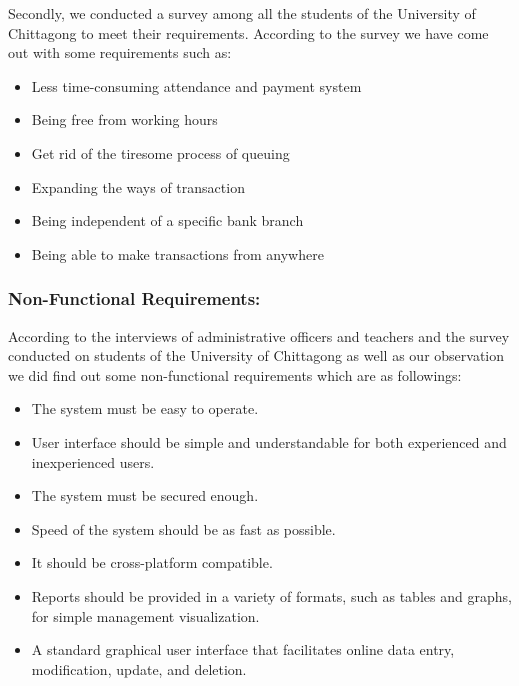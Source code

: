 Secondly, we conducted a survey among all the students of the University of Chittagong to meet their requirements. According to the survey we have come out with some requirements such as:
\begin{itemize}
	\item Less time-consuming attendance and payment system
	\item Being free from working hours 
	\item Get rid of the tiresome process of queuing
	\item Expanding the ways of transaction
	\item Being independent of a specific bank branch
	\item Being able to make transactions from anywhere
\end{itemize}

\subsubsection{Non-Functional Requirements:}\label{subsub:nonfunreq}
According to the interviews of administrative officers and teachers and the survey conducted on students of the University of Chittagong as well as our observation we did find out some non-functional requirements which are as followings:
\begin{itemize}
	\item The system must be easy to operate.
	\item User interface should be simple and understandable for both experienced and inexperienced users.
	\item The system must be secured enough.
	\item Speed of the system should be as fast as possible.
	\item It should be cross-platform compatible.
	\item Reports should be provided in a variety of formats, such as tables and graphs, for simple management visualization.
	\item A standard graphical user interface that facilitates online data entry, modification, update, and deletion.
\end{itemize}
